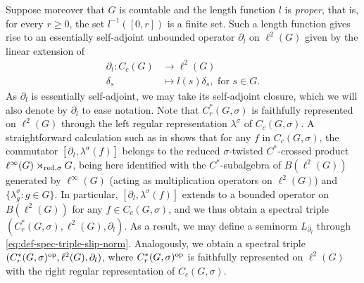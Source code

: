 \documentclass[11pt, a4paper, oneside, final, reqno]{amsart}
\newcommand{\Cred}{C^*_r}
\theoremstyle{definition}
\theoremstyle{plain}
\theoremstyle{remark}
\numberwithin{equation}{section}
\begin{document}
Suppose moreover that $G$ is countable and the length function $l$ is \emph{proper}, that is, for every $r \geq 0$, the set $l^{-1}([0,r])$ is a finite set. Such a length function gives rise to an essentially self-adjoint unbounded operator $\partial_l$ on $\ell^2(G)$ given by the linear extension of
\begin{equation*}
\begin{split}
    \partial_l \colon C_c(G) & \to \ell^2(G) \\
    \delta_s & \mapsto l(s) \delta_s,\text{ for }s\in G.
\end{split}
\end{equation*}
As $\partial_l$ is essentially self-adjoint, we may take its self-adjoint closure, which we will also denote by $\partial_l$ to ease notation. 
Note that $\Cred(G,\sigma)$ is faithfully represented on $\ell^2(G)$ through the left regular representation $\lambda^\sigma$ of $C_c(G,\sigma)$. 
A straightforward calculation such as in \cite[p.~614]{Rieffel02} shows that for any $f$ in $C_c(G, \sigma)$,  the commutator $[\partial_l, \lambda^\sigma(f)]$ belongs to the reduced $\sigma$-twisted $C^*$-crossed product $\ell^\infty(G) \rtimes_{{\rm red}, \sigma} G$, being here identified with the $C^*$-subalgebra of $B(\ell^2(G))$ generated by $\ell^\infty(G)$ (acting as multiplication operators on $\ell^2(G)$) and $\{\lambda^\sigma_g :g \in G\}$. 
In particular, $[\partial_l, \lambda^\sigma(f)]$ extends to a bounded operator on $B(\ell^2(G))$  for any $f \in C_c(G,\sigma)$, and we thus obtain a spectral triple $(C^*_r(G, \sigma),\ell^2(G),\partial_l)$. As a result, we may define a seminorm $L_{\partial_l}$ through \eqref{eq:def-spec-triple-slip-norm}. 
Analogously, we obtain a spectral triple $(C^*_r(G, \sigma)^{\rm op},\ell^2(G),\partial_l)$, where $\Cred(G,\sigma)^{\rm op}$ is faithfully represented on $\ell^2(G)$ with the right regular representation of $C_c(G,\sigma)$.
\end{document}
